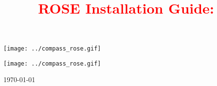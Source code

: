 \documentclass[10pt]{book}
\begin{document}
%
%


\title{ {\bf \textcolor{red}{         ROSE Installation Guide:  
}}}

\author{ }



\label{Rose:postscriptVersionOfUserManual}

\begin{htmlonly}
   \centering \texttt{[image: ../compass\_rose.gif]}
\end{htmlonly}

\maketitle

\begin{htmlonly}
   \centering \texttt{[image: ../compass\_rose.gif]}
\end{htmlonly}

\begin{center}
\today
\end{center}





\end{document}
